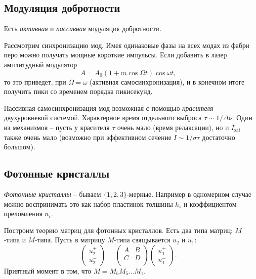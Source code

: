 \subsection{Модуляция добротности}


Есть \textit{активная} и \textit{пассивная} модуляция добротности. 

Рассмотрим синхронизацию мод. Имея одинаковые фазы на всех модах из фабри перо можно получать мощные короткие импульсы. Если добавить в лазер амплитудный модулятор
\begin{equation*}
    A = A_0 (1 + m \cos \Omega t) \cos \omega t,
\end{equation*}
то это приведет, при $\Omega = \omega$ (активная самосинхронизация), и в конечном итоге получить пики со временем порядка пикисекунд. 



Пассивная самосинхронизация мод возможная с помощью \textit{красителя} -- двухуровневой системой. Характерное время отдельного выброса $\tau \sim 1/\Delta \nu$. Один из механизмов -- пусть у красителя $\tau$  очень мало (время релаксации), но и $I_{\text{sat}}$ также очень мало (возможно при эффективном сечение $I \sim 1/\sigma\tau$ достаточно большом). 





\subsection{Фотонные кристаллы}

\textit{Фотонные кристаллы} -- бываем $\{1, 2, 3\}$-мерные. Например в одномерном случае можно воспринимать это как набор пластинок толшины $h_i$ и коэффициентом преломления $n_i$. 


Построим теорию матриц для фотонных кристаллов. Есть два типа матриц: $M$-типа и $M$-типа. Пусть в матрицу $M$-типа свящывается $u_2$ и $u_1$:
\begin{equation*}
    \begin{pmatrix}
        u_2^+ \\ u_2^-
    \end{pmatrix} = 
    \begin{pmatrix}
        A & B \\
        C & D \\
    \end{pmatrix}
    \begin{pmatrix}
        u_1^+ \\ u_1^-
    \end{pmatrix}.
\end{equation*}
Приятный момент в том, что $M = M_6 M_5 \ldots M_1$. 

